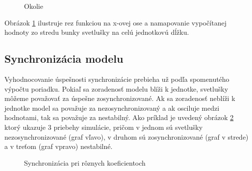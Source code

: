 \documentclass[a4paper, 11pt]{article}
\begin{document}
\begin{figure}[ht]
    \centering
\caption{Okolie\label{Okolie}}
\end{figure}

Obrázok \ref{Okolie} ilustruje rez funkciou na x-ovej ose a namapovanie vypočítanej hodnoty zo stredu bunky svetlušky na celú jednotkovú dĺžku.

\pagebreak


\subsection{Synchronizácia modelu} \label{sec_synchron}

Vyhodnocovanie úspešnosti synchronizácie prebieha už podľa spomenutého výpočtu poriadku. Pokiaľ sa zoradenosť modelu blíži k jednotke, svetlušky môžeme považovať za úspešne zosynchronizované. Ak sa zoradenosť neblíži k jednotke model sa považuje za nezosynchronizovaný a ak osciluje medzi hodnotami, tak sa považuje za nestabilný.
Ako príklad je uvedený obrázok \ref{Order} ktorý ukazuje 3 priebehy simulácie, pričom v jednom sú svetlušky nezosynchronizované (graf vľavo), v druhom sú zosynchronizované (graf v strede) a v treťom (graf vpravo) nestabilné.

\begin{figure}[ht]
    \hspace*{-1.1cm}
\caption{Synchronizácia pri rôznych koeficientoch\label{Order}}
\end{figure}
\end{document}
